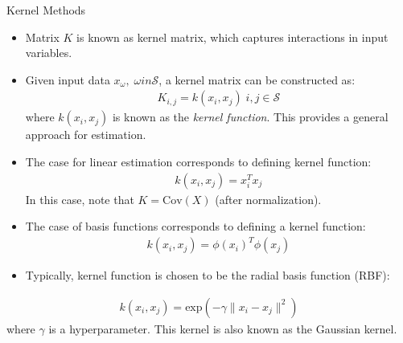 \documentclass[9pt]{beamer}
\begin{document}

\begin{frame}{Kernel Methods}
\begin{itemize}
\item Matrix $K$ is known as kernel matrix, which captures interactions in input variables. 
\item Given input data $x_\omega,\; \omega in \mathcal{S}$, a kernel matrix can be constructed as:
\begin{align*}
K_{i,j}=k(x_i,x_j)\; i,j\in \mathcal{S}
\end{align*}
where $k(x_i,x_j)$ is known as the {\em kernel function}. This provides a general approach for estimation. 
\item The case for linear estimation corresponds to defining kernel function:
\begin{align*}
k(x_i,x_j)=x_i^Tx_j
\end{align*}
In this case, note that $K=\textrm{Cov}(X)$ (after normalization). 
\item The case of basis functions corresponds to defining a kernel function:
\begin{align*}
k(x_i,x_j)=\phi(x_i)^T\phi(x_j)
\end{align*}
\item Typically, kernel function is chosen to be the radial basis function (RBF):
\end{itemize}
\begin{align*}
k(x_i,x_j)=\textrm{exp}(-\gamma\|x_i-x_j\|^2)
\end{align*}
where $\gamma$ is a hyperparameter. This kernel is also known as the Gaussian kernel.  
\end{frame}

\end{document}
